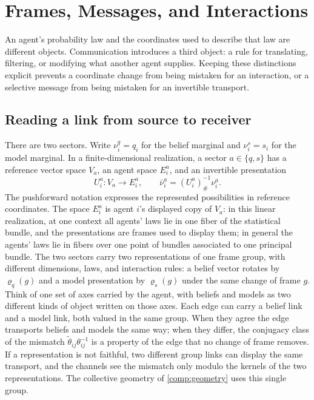 \chapter{Frames, Messages, and Interactions}
\label{comp:links}

An agent's probability law and the coordinates used to describe that law are different objects. Communication introduces a third object: a rule for translating, filtering, or modifying what another agent supplies. Keeping these distinctions explicit prevents a coordinate change from being mistaken for an interaction, or a selective message from being mistaken for an invertible transport.

\section{Reading a link from source to receiver}

There are two sectors. Write $\nu_i^q=q_i$ for the belief marginal and $\nu_i^s=s_i$ for the model marginal. In a finite-dimensional realization, a sector $a\in\{q,s\}$ has a reference vector space $V_a$, an agent space $E_i^a$, and an invertible presentation
\begin{equation}
U_i^a:V_a\longrightarrow E_i^a,\qquad
\bar\nu_i^a=(U_i^a)^{-1}_\#\nu_i^a.
\end{equation}
The pushforward notation expresses the represented possibilities in reference coordinates. The space $E_i^a$ is agent $i$'s displayed copy of $V_a$: in this linear realization, at one context all agents' laws lie in one fiber of the statistical bundle, and the presentations are frames used to display them; in general the agents' laws lie in fibers over one point of bundles associated to one principal bundle. The two sectors carry two representations of one frame group, with different dimensions, laws, and interaction rules: a belief vector rotates by $\varrho_q(g)$ and a model presentation by $\varrho_s(g)$ under the same change of frame $g$. Think of one set of axes carried by the agent, with beliefs and models as two different kinds of object written on those axes. Each edge can carry a belief link and a model link, both valued in the same group. When they agree the edge transports beliefs and models the same way; when they differ, the conjugacy class of the mismatch $\tilde\theta_{ij}\theta_{ij}^{-1}$ is a property of the edge that no change of frame removes. If a representation is not faithful, two different group links can display the same transport, and the channels see the mismatch only modulo the kernels of the two representations. The collective geometry of \cref{comp:geometry} uses this single group.

